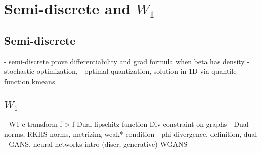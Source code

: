
\section{Semi-discrete and $W_1$}

\subsection{Semi-discrete}

- semi-discrete
  prove differentiability and grad formula when beta has density 
- stochastic optimization, 
- optimal quantization, 
   solution in 1D via quantile function
   kmeans

\subsection{$W_1$}

- W1
  c-transform f->-f
  Dual lipschitz function
  Div constraint
  on graphs 
- Dual norms, RKHS norms, metrizing weak* condition
- phi-divergence, definition, dual
- GANS, neural networks intro (discr, generative) WGANS